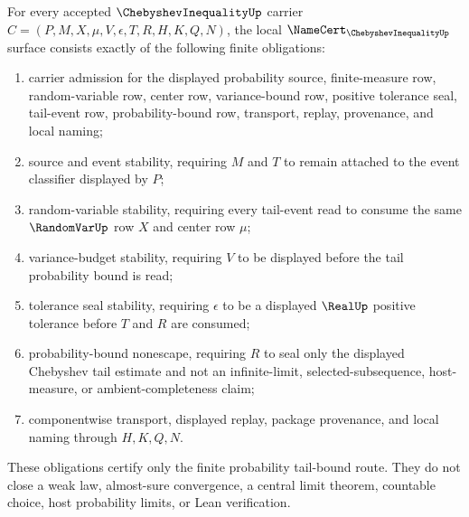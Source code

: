 \begin{theorem}\label{thm:chebyshev-inequality-namecert-obligations}
For every accepted $\ChebyshevInequalityUp$ carrier $C=(P,M,X,\mu,V,\epsilon,T,R,H,K,Q,N)$, the local $\NameCert_{\ChebyshevInequalityUp}$ surface consists exactly of the following finite obligations:
\begin{enumerate}
\item carrier admission for the displayed probability source, finite-measure row, random-variable row, center row, variance-bound row, positive tolerance seal, tail-event row, probability-bound row, transport, replay, provenance, and local naming;
\item source and event stability, requiring $M$ and $T$ to remain attached to the event classifier displayed by $P$;
\item random-variable stability, requiring every tail-event read to consume the same $\RandomVarUp$ row $X$ and center row $\mu$;
\item variance-budget stability, requiring $V$ to be displayed before the tail probability bound is read;
\item tolerance seal stability, requiring $\epsilon$ to be a displayed $\RealUp$ positive tolerance before $T$ and $R$ are consumed;
\item probability-bound nonescape, requiring $R$ to seal only the displayed Chebyshev tail estimate and not an infinite-limit, selected-subsequence, host-measure, or ambient-completeness claim;
\item componentwise transport, displayed replay, package provenance, and local naming through $H,K,Q,N$.
\end{enumerate}
These obligations certify only the finite probability tail-bound route. They do not close a weak law, almost-sure convergence, a central limit theorem, countable choice, host probability limits, or Lean verification.
\end{theorem}
